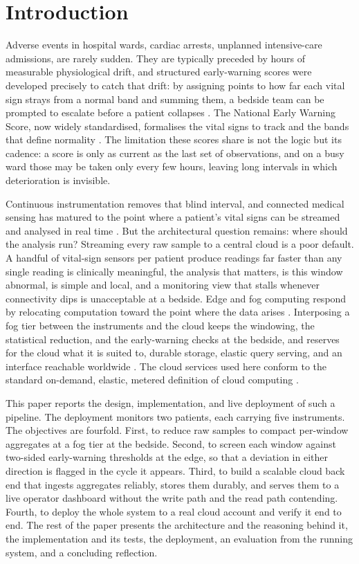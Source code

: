 \documentclass[conference]{IEEEtran}
\begin{document}
\section{Introduction}

Adverse events in hospital wards, cardiac arrests, unplanned intensive-care admissions, are rarely sudden. They are typically preceded by hours of measurable physiological drift, and structured early-warning scores were developed precisely to catch that drift: by assigning points to how far each vital sign strays from a normal band and summing them, a bedside team can be prompted to escalate before a patient collapses \cite{subbe2001}. The National Early Warning Score, now widely standardised, formalises the vital signs to track and the bands that define normality \cite{news2017}. The limitation these scores share is not the logic but its cadence: a score is only as current as the last set of observations, and on a busy ward those may be taken only every few hours, leaving long intervals in which deterioration is invisible.

Continuous instrumentation removes that blind interval, and connected medical sensing has matured to the point where a patient's vital signs can be streamed and analysed in real time \cite{islam2015}. But the architectural question remains: where should the analysis run? Streaming every raw sample to a central cloud is a poor default. A handful of vital-sign sensors per patient produce readings far faster than any single reading is clinically meaningful, the analysis that matters, is this window abnormal, is simple and local, and a monitoring view that stalls whenever connectivity dips is unacceptable at a bedside. Edge and fog computing respond by relocating computation toward the point where the data arises \cite{shi2016}. Interposing a fog tier between the instruments and the cloud keeps the windowing, the statistical reduction, and the early-warning checks at the bedside, and reserves for the cloud what it is suited to, durable storage, elastic query serving, and an interface reachable worldwide \cite{bonomi2012, naha2018}. The cloud services used here conform to the standard on-demand, elastic, metered definition of cloud computing \cite{mell2011}.

This paper reports the design, implementation, and live deployment of such a pipeline. The deployment monitors two patients, each carrying five instruments. The objectives are fourfold. First, to reduce raw samples to compact per-window aggregates at a fog tier at the bedside. Second, to screen each window against two-sided early-warning thresholds at the edge, so that a deviation in either direction is flagged in the cycle it appears. Third, to build a scalable cloud back end that ingests aggregates reliably, stores them durably, and serves them to a live operator dashboard without the write path and the read path contending. Fourth, to deploy the whole system to a real cloud account and verify it end to end. The rest of the paper presents the architecture and the reasoning behind it, the implementation and its tests, the deployment, an evaluation from the running system, and a concluding reflection.
\end{document}
